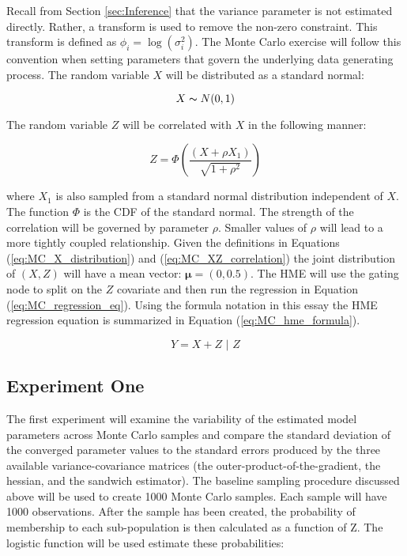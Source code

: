 \documentclass[12pt]{article}
\theoremstyle{definition}
\begin{document}
Recall from Section \ref{sec:Inference} that the variance parameter is not estimated directly. Rather, a transform is used to remove the non-zero constraint. This transform is defined as $\phi_{i} = \log(\sigma^{2}_{i})$. The Monte Carlo exercise will follow this convention when setting parameters that govern the underlying data generating process. The random variable $X$ will be distributed as a standard normal:

\begin{equation} \label{eq:MC_X_distribution}
    X \thicksim N(0, 1)
\end{equation}

The random variable $Z$ will be correlated with $X$ in the following manner:

\begin{equation} \label{eq:MC_XZ_correlation}
    Z = \Phi \left( \frac{(X + \rho X_{1})}{\sqrt{1 + \rho^{2}}} \right)
\end{equation}

where $X_{1}$ is also sampled from a standard normal distribution independent of $X$. The function $\Phi$ is the CDF of the standard normal. The strength of the correlation will be governed by parameter $\rho$. Smaller values of $\rho$ will lead to a more tightly coupled relationship. Given the definitions in Equations (\ref{eq:MC_X_distribution}) and (\ref{eq:MC_XZ_correlation}) the joint distribution of $(X, Z)$ will have a mean vector: $\boldsymbol{\mu} = (0, 0.5)$. The HME will use the gating node to split on the $Z$ covariate and then run the regression in Equation (\ref{eq:MC_regression_eq}). Using the formula notation in this essay the HME regression equation is summarized in Equation (\ref{eq:MC_hme_formula}).

\begin{equation} \label{eq:MC_hme_formula}
    Y = X + Z \,\,|\,\, Z
\end{equation}


\subsection{Experiment One}

The first experiment will examine the variability of the estimated model parameters across Monte Carlo samples and compare the standard deviation of the converged parameter values to the standard errors produced by the three available variance-covariance matrices (the outer-product-of-the-gradient, the hessian, and the sandwich estimator). The baseline sampling procedure discussed above will be used to create 1000 Monte Carlo samples. Each sample will have 1000 observations. After the sample has been created, the probability of membership to each sub-population is then calculated as a function of Z. The logistic function will be used estimate these probabilities:
\end{document}
